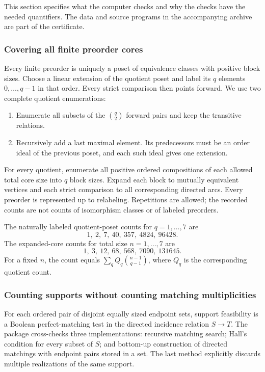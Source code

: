 \documentclass[11pt]{article}
\numberwithin{equation}{section}
\theoremstyle{definition}\newtheorem{definition}[theorem]{Definition}\newtheorem{remark}[theorem]{Remark}
\begin{document}
This section specifies what the computer checks and why the checks have the needed quantifiers. The data and source programs in the accompanying archive are part of the certificate.

\subsubsection{Covering all finite preorder cores}

Every finite preorder is uniquely a poset of equivalence classes with positive block sizes. Choose a linear extension of the quotient poset and label its $q$ elements $0,\ldots,q-1$ in that order. Every strict comparison then points forward. We use two complete quotient enumerations:
\begin{enumerate}[itemsep=2pt]
\item Enumerate all subsets of the $\binom q2$ forward pairs and keep the transitive relations.
\item Recursively add a last maximal element. Its predecessors must be an order ideal of the previous poset, and each such ideal gives one extension.
\end{enumerate}
For every quotient, enumerate all positive ordered compositions of each allowed total core size into $q$ block sizes. Expand each block to mutually equivalent vertices and each strict comparison to all corresponding directed arcs. Every preorder is represented up to relabeling. Repetitions are allowed; the recorded counts are not counts of isomorphism classes or of labeled preorders.

The naturally labeled quotient-poset counts for $q=1,\ldots,7$ are
\[
 1,\ 2,\ 7,\ 40,\ 357,\ 4824,\ 96428.
\]
The expanded-core counts for total size $n=1,\ldots,7$ are
\begin{equation}\label{pgr:u:d3:eq:corecounts}
 1,\ 3,\ 12,\ 68,\ 568,\ 7090,\ 131645.
\end{equation}
For a fixed $n$, the count equals $\sum_q Q_q\binom{n-1}{q-1}$, where $Q_q$ is the corresponding quotient count.

\subsubsection{Counting supports without counting matching multiplicities}

For each ordered pair of disjoint equally sized endpoint sets, support feasibility is a Boolean perfect-matching test in the directed incidence relation $S\to T$. The package cross-checks three implementations: recursive matching search; Hall's condition for every subset of $S$; and bottom-up construction of directed matchings with endpoint pairs stored in a set. The last method explicitly discards multiple realizations of the same support.
\end{document}
